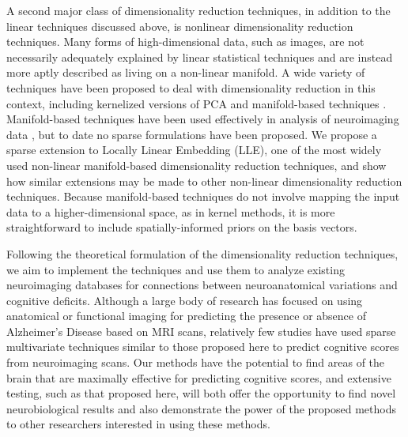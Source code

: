 \documentclass[11pt]{nih}
\begin{document}
A second major class of dimensionality reduction techniques, in addition to the linear techniques discussed above, is nonlinear dimensionality reduction techniques.  Many forms of high-dimensional data, such as images, are not necessarily adequately explained by linear statistical techniques and are instead more aptly described as living on a non-linear manifold.  A wide variety of techniques have been proposed to deal with dimensionality reduction in this context, including kernelized versions of PCA \cite{scholkopf_kernel_1997} and manifold-based techniques \cite{tenenbaum_global_2000,roweis_nonlinear_2000,belkin_laplacian_2003,maaten_dimensionality_2008}.  Manifold-based techniques have been used effectively in analysis of neuroimaging data \cite{wolz_leap:_2010,wolz_nonlinear_2012}, but to date no sparse formulations have been proposed.  We propose a sparse extension to Locally Linear Embedding (LLE), one of the most widely used non-linear manifold-based dimensionality reduction techniques, and show how similar extensions may be made to other non-linear dimensionality reduction techniques.  Because manifold-based techniques do not involve mapping the input data to a higher-dimensional space, as in kernel methods, it is more straightforward to include spatially-informed priors on the basis vectors.  

Following the theoretical formulation of the dimensionality reduction techniques, we aim to implement the techniques and use them to analyze existing neuroimaging databases for connections between neuroanatomical variations and cognitive deficits.  Although a large body of research has focused on using anatomical or functional imaging for predicting the presence or absence of Alzheimer's Disease based on MRI scans, relatively few studies have used  sparse multivariate techniques similar to those proposed here to predict cognitive scores from neuroimaging scans.  Our methods have the potential to find areas of the brain that are maximally effective for predicting cognitive scores, and extensive testing, such as that proposed here, will both offer the opportunity to find novel neurobiological results and also demonstrate the power of the proposed methods to other researchers interested in using these methods.  
\end{document}
